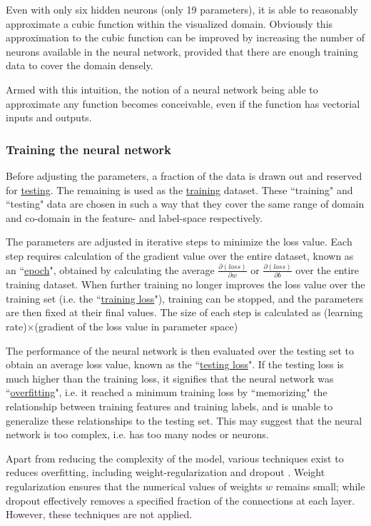 \documentclass[a4paper, 12pt]{article}
\begin{document}
    Even with only six hidden neurons (only 19 parameters), it is able to reasonably approximate a cubic function within the visualized domain. Obviously this approximation to the cubic function can be improved by increasing the number of neurons available in the neural network, provided that there are enough training data to cover the domain densely.

    Armed with this intuition, the notion of a neural network being able to approximate any function becomes conceivable, even if the function has vectorial inputs and outputs. %

\subsubsection{Training the neural network}\label{sec:training}
    Before adjusting the parameters, a fraction of the data is drawn out and reserved for \underline{testing}. The remaining is used as the \underline{training} dataset. These ``training" and ``testing" data are chosen in such a way that they cover the same range of domain and co-domain in the feature- and label-space respectively.
    
    The parameters are adjusted in iterative steps to minimize the loss value. Each step requires calculation of the gradient value over the entire dataset, known as an ``\underline{epoch}", obtained by calculating the average $\frac{\partial (loss)}{\partial w}$ or $\frac{\partial (loss)}{\partial b}$ over the entire training dataset. When further training no longer improves the loss value over the training set (i.e. the ``\underline{training loss}"), training can be stopped, and the parameters are then fixed at their final values. The size of each step is calculated as (learning rate)$\times$(gradient of the loss value in parameter space)

    The performance of the neural network is then evaluated over the testing set to obtain an average loss value, known as the ``\underline{testing loss}". If the testing loss is much higher than the training loss, it signifies that the neural network was ``\underline{overfitting}", i.e. it reached a minimum training loss by ``memorizing" the relationship between training features and training labels, and is unable to generalize these relationships to the testing set. This may suggest that the neural network is too complex, i.e. has too many nodes or neurons.

    Apart from reducing the complexity of the model, various techniques exist to reduces overfitting, including weight-regularization and dropout \cite{TensorflowOverfitting}. Weight regularization ensures that the numerical values of weights $w$ remains small; while dropout effectively removes a specified fraction of the connections at each layer. However, these techniques are not applied.
\end{document}

